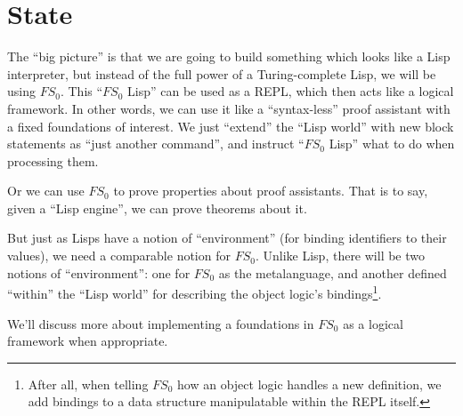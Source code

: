 \section{State}

\begin{node}
The ``big picture'' is that we are going to build something which
looks like a Lisp interpreter, but instead of the full power of a
Turing-complete Lisp, we will be using $FS_{0}$. This ``$FS_{0}$ Lisp''
can be used as a REPL, which then acts like a logical framework. In
other words, we can use it like a ``syntax-less'' proof assistant with
a fixed foundations of interest. We just ``extend'' the ``Lisp world''
with new block statements as ``just another command'', and instruct
``$FS_{0}$ Lisp'' what to do when processing them.

Or we can use $FS_{0}$ to prove properties about proof
assistants. That is to say, given a ``Lisp engine'', we can prove
theorems about it.

But just as Lisps have a notion of ``environment'' (for binding
identifiers to their values), we need a comparable notion for
$FS_{0}$. Unlike Lisp, there will be two notions of ``environment'':
one for $FS_{0}$ as the metalanguage, and another defined ``within''
the ``Lisp world'' for describing the object logic's
bindings\footnote{After all, when telling $FS_{0}$ how an object logic
handles a new definition, we add bindings to a data structure
manipulatable within the REPL itself.}.

We'll discuss more about implementing a foundations in $FS_{0}$ as a
logical framework when appropriate.
\end{node}

